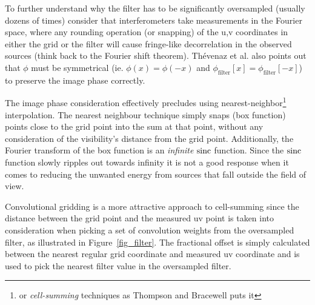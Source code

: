  To further understand why the filter has to be significantly oversampled (usually dozens of times) consider that interferometers take measurements 
 in the Fourier space, where any rounding operation (or snapping) of the u,v coordinates in either the grid
 or the filter will cause fringe-like decorrelation in the observed sources (think back to the Fourier shift theorem). Th\'evenaz et al. \cite{thevenaz2000image} 
 also points out that $\phi$ must be symmetrical (ie. $\phi{(x)} = \phi{(-x)}$ and $\phi_{\text{filter}}[x] = \phi_{\text{filter}}[-x]$) to preserve 
 the image phase correctly.

 The image phase consideration effectively precludes using nearest-neighbor\footnote{or \textit{cell-summing} techniques as 
 Thompson and Bracewell \cite{thompson1974interpolation} puts it} interpolation. The nearest neighbour technique simply snaps (box function) 
 points close to the grid point into the sum at that point, without any consideration of the visibility's distance from the grid point. Additionally, 
 the Fourier transform of the box function is an \emph{infinite} $\operatorname*{sinc}$ function.  Since the $\operatorname*{sinc}$ function slowly ripples out 
 towards infinity it is not a good response when it comes to reducing the unwanted energy from sources that fall outside the field of view.
 
 Convolutional gridding is a more attractive approach to cell-summing since the distance between the grid point and the
 measured uv point is taken into consideration when picking a set of convolution weights from the oversampled filter, as illustrated in 
 Figure~\ref{fig_filter}. The fractional offset is simply calculated between the nearest regular grid coordinate and measured uv coordinate and is used to pick
 the nearest filter value in the oversampled filter.
 
